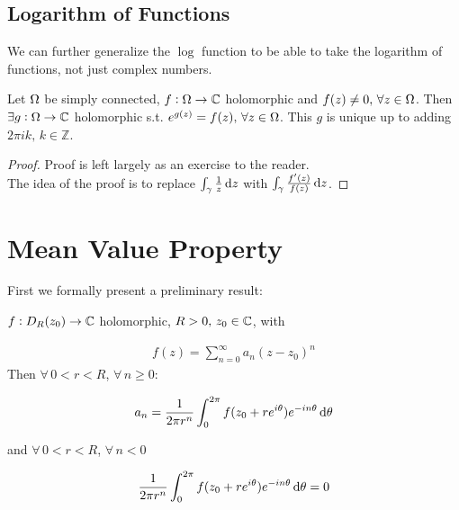 \subsection{Logarithm of Functions}

We can further generalize the $\log$ function to be able to take the logarithm of functions, not just complex numbers.

\begin{theorem}
Let $\Omega$ be simply connected, $f:\Omega \rightarrow \mathbb{C}$ holomorphic and $f(z) \neq 0, \, \forall z \in \Omega$. Then $\exists g: \Omega \to \mathbb{C}$ holomorphic s.t. $e^{g(z)} = f(z), \, \forall z \in \Omega$. This $g$ is unique up to adding $2 \pi i k, \, k \in \mathbb{Z}$.
\end{theorem}

\begin{proof}
Proof is left largely as an exercise to the reader.\\

The idea of the proof is to replace $\int_\gamma \frac{1}{z} \dif z$ with $\int_\gamma \frac{f'(z)}{f(z)} \dif z$.
\end{proof}

\section{Mean Value Property}

First we formally present a preliminary result:

\begin{proposition}
$f: D_R(z_0) \to \mathbb{C}$ holomorphic, $R> 0, \, z_0 \in \mathbb{C}$, with

\begin{align*}
    f(z) = \sum_{n=0}^ \infty a_n (z-z_0)^n
\end{align*}
Then $\forall \, 0 < r< R$, $\forall \, n \geq 0$:

\begin{align*}
    a_n = \frac{1}{2 \pi r^n} \int_0^{2 \pi} f ( z_0 + re^{i \theta} ) e^{-i n \theta } \dif \theta
\end{align*}

and $\forall \, 0 < r< R$, $\forall \, n < 0$

\begin{align*}
    \frac{1}{2 \pi r^n} \int_0^{2 \pi} f ( z_0 + re^{i \theta} ) e^{-i n \theta } \dif \theta = 0 
\end{align*}
\end{proposition}


